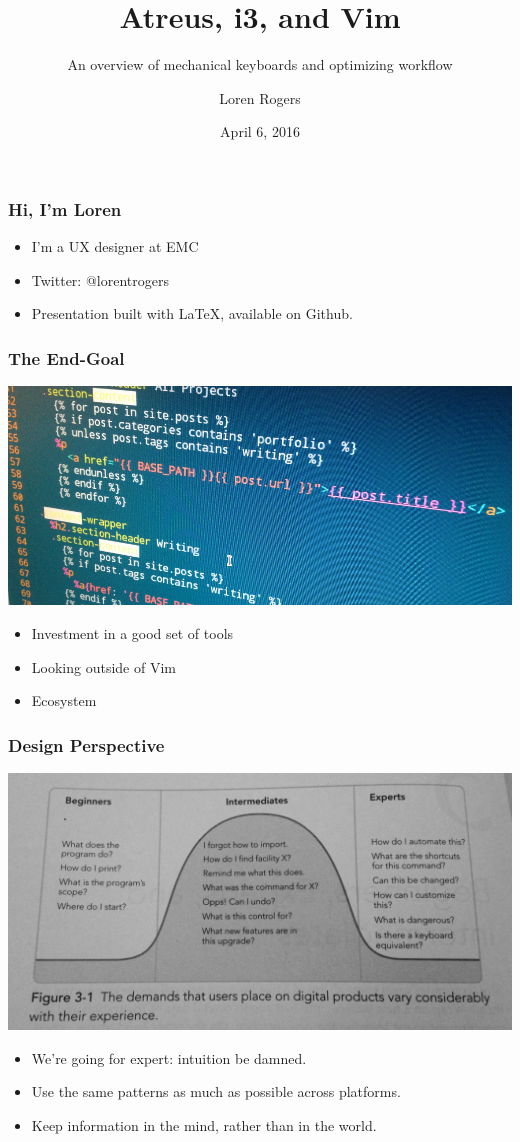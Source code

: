 \documentclass{beamer}
\title{Atreus, i3, and Vim}
\subtitle{An overview of mechanical keyboards and optimizing workflow}
\author{Loren Rogers}
\date{April 6, 2016}
\begin{document}
\maketitle

\begin{frame}
  \frametitle{Hi, I'm Loren}
  \begin{itemize}
    \item I'm a UX designer at EMC
    \item Twitter: @lorentrogers
    \item Presentation built with \LaTeX, available on Github.
  \end{itemize}
\end{frame}

\begin{frame}
  \frametitle{The End-Goal}
  \includegraphics[scale=0.2]{images/vim}

  \begin{itemize}
    \item Investment in a good set of tools
    \item Looking outside of Vim
    \item Ecosystem
  \end{itemize}
\end{frame}

\begin{frame}
  \frametitle{Design Perspective}

  \includegraphics[scale=0.1]{images/about-face-diagram}

  \begin{itemize}
    \item We're going for expert: intuition be damned.
    \item Use the same patterns as much as possible across platforms.
    \item Keep information in the mind, rather than in the world.
  \end{itemize}
\end{frame}
\end{document}
